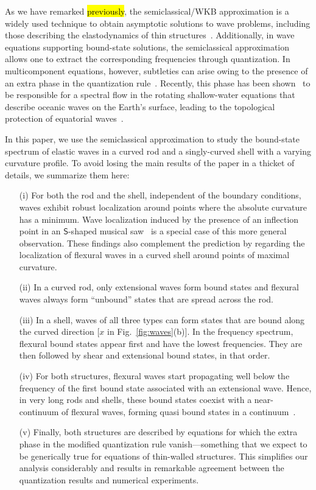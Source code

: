 As we have remarked \hl{previously}, the semiclassical/WKB approximation is a widely used technique to obtain asymptotic solutions to wave problems, including those describing the elastodynamics of thin structures~\cite{pierce1970,nielsen2014,sndergaard2016,mohammed2021}.
Additionally, in wave equations supporting bound-state solutions, the semiclassical approximation allows one to extract the corresponding frequencies through quantization.
In multicomponent equations, however, subtleties can arise owing to the presence of an extra phase in the quantization rule~\cite{yabana1986,kaufman1987,littlejohn1991,littlejohn1991a}.
Recently, this phase has been shown~\cite{venaille2023} to be responsible for a spectral flow in the rotating shallow-water equations that describe oceanic waves on the Earth's surface, leading to the topological protection of equatorial waves~\cite{delplace2017}.

In this paper, we use the semiclassical approximation to study the bound-state spectrum of elastic waves in a curved rod and a singly-curved shell with a varying curvature profile.
To avoid losing the main results of the paper in a thicket of details, we summarize them here:
%
\begin{enumerate}
  \setlength\itemsep{0em}
  \item[(i)] For both the rod and the shell, independent of the boundary conditions, waves exhibit robust localization around points where the absolute curvature has a minimum.
    Wave localization induced by the presence of an inflection point in an $\mathsf{S}$-shaped musical saw~\cite{scott1992,shankar2022} is a special case of this more general observation.
    These findings also complement the prediction by \citet{mohammed2021} regarding the localization of flexural waves in a curved shell around points of maximal curvature.
  \item[(ii)] In a curved rod, only extensional waves form bound states and flexural waves always form ``unbound'' states that are spread across the rod.
  \item[(iii)] In a shell, waves of all three types can form states that are bound along the curved direction
    [$x$ in Fig.~\ref{fig:waves}(b)].
    In the frequency spectrum, flexural bound states appear first and have the lowest frequencies.
    They are then followed by shear and extensional bound states, in that order.
  \item[(iv)] For both structures, flexural waves start propagating well below the frequency of the first bound state associated with an extensional wave.
    Hence, in very long rods and shells, these bound states coexist with a near-continuum of flexural waves, forming quasi bound states in a continuum~\cite{hsu2016}.
  \item[(v)]
    Finally, both structures are described by equations for which the extra phase in the modified quantization rule vanish---something that we expect to be generically true for equations of thin-walled structures.
    This simplifies our analysis considerably and results in remarkable agreement between the quantization results and numerical experiments.
\end{enumerate}

